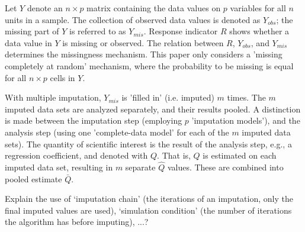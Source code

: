 \documentclass[article]{jss}
\begin{document}
Let $Y$ denote an $n \times p$ matrix containing the data values on $p$ variables for all $n$ units in a sample. The collection of observed data values is denoted as $Y_{obs}$; the missing part of $Y$ is referred to as $Y_{mis}$. Response indicator $R$ shows whether a data value in $Y$ is missing or observed. The relation between $R$, $Y_{obs}$, and $Y_{mis}$ determines the missingness mechanism. This paper only considers a 'missing completely at random' mechanism, where the probability to be missing is equal for all $n \times p$ cells in $Y$.

With multiple imputation, $Y_{mis}$ is 'filled in' (i.e. imputed) $m$ times. The $m$ imputed data sets are analyzed separately, and their results pooled. A distinction is made between the imputation step (employing $p$ 'imputation models'), and the analysis step (using one 'complete-data model' for each of the $m$ imputed data sets). The quantity of scientific interest is the result of the analysis step, e.g., a regression coefficient, and denoted with $Q$. That is, $Q$ is estimated on each imputed data set, resulting in $m$ separate $\hat{Q}$ values. These are combined into pooled estimate $\bar{Q}$.

Explain the use of `imputation chain' (the iterations of an imputation, only the final imputed values are used), `simulation condition' (the number of iterations the algorithm has before imputing), ...?

\end{document}
